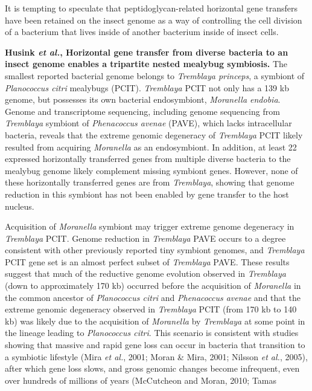 \documentclass[11pt]{article}
\begin{document}
\begin{sloppypar}
It is tempting to speculate that peptidoglycan-related horizontal gene transfers have been retained on the insect genome as a way of controlling the cell division of a bacterium that lives inside of another bacterium inside of insect cells.
\par
\textbf{Husink \textit{et al.}, Horizontal gene transfer from diverse bacteria to an insect genome enables a tripartite nested mealybug symbiosis.} \newline
The smallest reported bacterial genome belongs to \textit{Tremblaya princeps}, a symbiont of \textit{Planococcus citri} mealybugs (PCIT). 
\textit{Tremblaya} PCIT not only has a 139 kb genome, but possesses its own bacterial endosymbiont, \textit{Moranella endobia}. 
Genome and transcriptome sequencing, including genome sequencing from \textit{Tremblaya} symbiont of \textit{Phenacoccus avenae} (PAVE), which lacks intracellular bacteria, reveals that the extreme genomic degeneracy of \textit{Tremblaya} PCIT likely resulted from acquiring \textit{Moranella} as an endosymbiont. 
In addition, at least 22 expressed horizontally transferred genes from multiple diverse bacteria to the mealybug genome likely complement missing symbiont genes. 
However, none of these horizontally transferred genes are from \textit{Tremblaya}, showing that genome reduction in this symbiont has not been enabled by gene transfer to the host nucleus.
\par
Acquisition of \textit{Moranella} symbiont may trigger extreme genome degeneracy in \textit{Tremblaya} PCIT. 
Genome reduction in \textit{Tremblaya} PAVE occurs to a degree consistent with other previously reported tiny symbiont genomes, and \textit{Tremblaya} PCIT gene set is an almost perfect subset of \textit{Tremblaya} PAVE. 
These results suggest that much of the reductive genome evolution observed in \textit{Tremblaya} (down to approximately 170 kb) occurred before the acquisition of \textit{Moranella} in the common ancestor of \textit{Planococcus citri} and \textit{Phenacoccus avenae} and that the extreme genomic degeneracy observed in \textit{Tremblaya} PCIT (from 170 kb to 140 kb) was likely due to the acquisition of \textit{Moranella} by \textit{Tremblaya} at some point in the lineage leading to \textit{Planococcus citri}. 
This scenario is consistent with studies showing that massive and rapid gene loss can occur in bacteria that transition to a symbiotic lifestyle (Mira \textit{et al.}, 2001; Moran & Mira, 2001; Nilsson \textit{et al.}, 2005), after which gene loss slows, and gross genomic changes become infrequent, even over hundreds of millions of years (McCutcheon and Moran, 2010; Tamas

\end{sloppypar}
\end{document}
